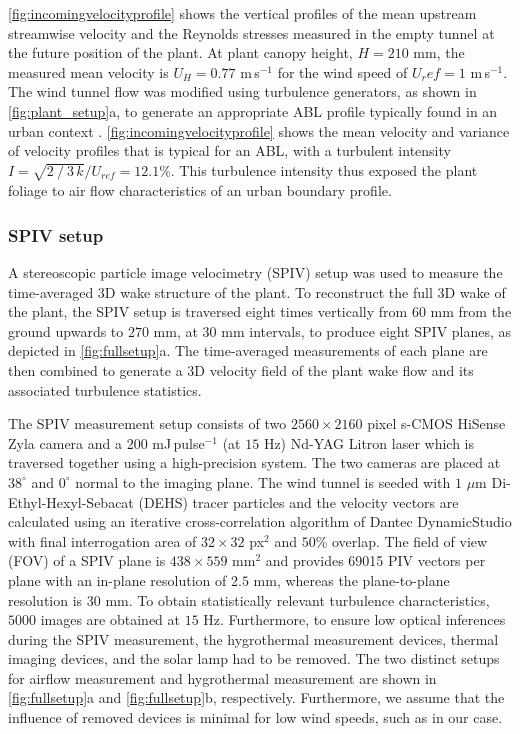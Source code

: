 \cref{fig:incomingvelocityprofile} shows the vertical profiles of the mean upstream streamwise velocity and the Reynolds stresses measured in the empty tunnel at the future position of the plant. At plant canopy height,  $H=210$ mm, the measured mean velocity is $U_H=0.77$ m\,s$^{-1}$  for the wind speed of $U_ref=1$ m\,s$^{-1}$. The wind tunnel flow was modified using turbulence generators, as shown in \cref{fig:plant_setup}a, to generate an appropriate ABL profile typically found in an urban context \citep{Tsalicoglou2018}. \cref{fig:incomingvelocityprofile} shows the mean velocity and variance of velocity profiles that is typical for an ABL, with a turbulent intensity $I=\sqrt{2⁄3\,k}/U_{\textit{ref}}= 12.1$\%. This turbulence intensity thus exposed the plant foliage to air flow characteristics of an urban boundary profile. 


\subsubsection*{SPIV setup}
A stereoscopic particle image velocimetry (SPIV) setup was used to measure the time-averaged 3D wake structure of the plant. To reconstruct the full 3D wake of the plant, the SPIV setup is traversed eight times vertically from $60$ mm from the ground upwards to $270$ mm, at $30$ mm intervals, to produce eight SPIV planes, as depicted in \cref{fig:fullsetup}a. The time-averaged measurements of each plane are then combined to generate a 3D velocity field of the plant wake flow and its associated turbulence statistics. 

The SPIV measurement setup consists of two $2560 \times 2160$ pixel s-CMOS HiSense Zyla camera and a $200$ mJ\,pulse$^{-1}$ (at $15$ Hz) Nd-YAG Litron laser which is traversed together using a high-precision system. The two cameras are placed at $38^{\circ}$ and $0^{\circ}$ normal to the imaging plane. The wind tunnel is seeded with $1$ $\mu$m Di-Ethyl-Hexyl-Sebacat (DEHS) tracer particles and the velocity vectors are calculated using an iterative cross-correlation algorithm of Dantec DynamicStudio with final interrogation area of $32\times32$ px$^2$ and $50$\%  overlap. The field of view (FOV) of a SPIV plane is $438\times559$ mm$^2$ and provides \num{69015} PIV vectors per plane with an in-plane resolution of $2.5$ mm, whereas the plane-to-plane resolution is $30$ mm. To obtain statistically relevant turbulence characteristics, $5000$ images are obtained at $15$ Hz. Furthermore, to ensure low optical inferences during the SPIV measurement, the hygrothermal measurement devices, thermal imaging devices, and the solar lamp had to be removed. The two distinct setups for airflow measurement and hygrothermal measurement are shown in \cref{fig:fullsetup}a and \cref{fig:fullsetup}b, respectively. Furthermore, we assume that the influence of removed devices is minimal for low wind speeds, such as in our case.

